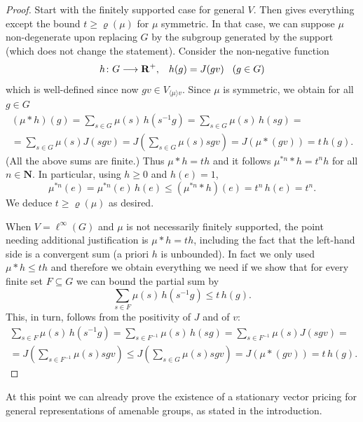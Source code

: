 \documentclass[11pt]{amsart}
\numberwithin{equation}{section}
\theoremstyle{definition}
\theoremstyle{definition}
\newcommand*{\RR}{\mathbf{R}}
\newcommand*{\NN}{\mathbf{N}}
\newcommand*{\se}{\subseteq}
\newcommand*{\inv}{^{-1}}
\newcommand*{\lra}{\longrightarrow}
\begin{document}
\begin{proof}
Start with the finitely supported case for general $V$. Then  gives everything except the bound $t\geq \varrho(\mu)$ for $\mu$ symmetric. In that case, we can suppose $\mu$ non-degenerate upon replacing $G$ by the subgroup generated by the support (which does not change the statement). Consider the non-negative function
\begin{equation*}
h\colon G \lra \RR^+, \kern3mm h(g) = J(g v) \kern3mm (g\in G)
\end{equation*}
which is well-defined since now $g v\in  V_{\langle \mu \rangle v}$. Since $\mu$ is symmetric, we obtain for all $g\in G$
\begin{multline*}
(\mu * h)(g) = \sum_{s\in G} \mu(s) \, h(s\inv g) =\sum_{s\in G} \mu(s) \, h(s g) =\\
%
=\sum_{s\in G} \mu(s)  J(s g v) =J\left(\sum_{s\in G} \mu(s)  s g v \right) = J(\mu *(g v)) = t \, h(g).
\end{multline*}
(All the above sums are finite.) Thus $\mu * h = t h$ and it follows $\mu^{* n}*h = t^n h$ for all $n\in \NN$. In particular, using $h\geq 0$ and $h(e)=1$,
\begin{equation*}
\mu^{* n} (e) = \mu^{* n} (e) \, h(e) \leq (\mu^{* n} *h)(e) = t^n \, h(e) = t^n. 
\end{equation*}
We deduce $t\geq \varrho(\mu)$ as desired.

\smallskip
When $V=\ell^\infty(G)$ and $\mu$ is not necessarily finitely supported, the point needing additional justification is $\mu * h = t h$, including the fact that the left-hand side is a convergent sum (a priori $h$ is unbounded). In fact we only used $\mu * h \leq t h$ and therefore we obtain everything we need if we show that for every finite set $F\se G$ we can bound the partial sum by
\begin{equation*}
\sum_{s\in F} \mu(s) \, h(s\inv g) \leq  t \, h(g).
\end{equation*}
This, in turn, follows from the positivity of $J$ and of $v$:
\begin{multline*}
\sum_{s\in F} \mu(s) \, h(s\inv g) =\sum_{s\in F\inv } \mu(s) \, h(s g) =\sum_{s\in F\inv} \mu(s)  J(s g v) =\\
%
=J\left(\sum_{s\in F\inv} \mu(s)  s g v \right) \leq J\left(\sum_{s\in G} \mu(s)  s g v \right) = J(\mu *(g v)) = t \, h(g).
\end{multline*}
\end{proof}

At this point we can already prove the existence of a stationary vector pricing for general representations of amenable groups, as stated in the introduction.
\end{document}
